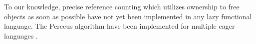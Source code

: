 \documentclass[9pt, twocolumn]{article}
\begin{document}
To our knowledge, precise reference counting which utilizes ownership to free objects as soon as possible have not yet been implemented in any lazy functional language.
The Perceus algorithm have been implemented for multiple eager languages \citep{reinking2021, ullrich2021, teeuwissen2023, pinto2023}.





%
%
%
%
%
%
\end{document}

